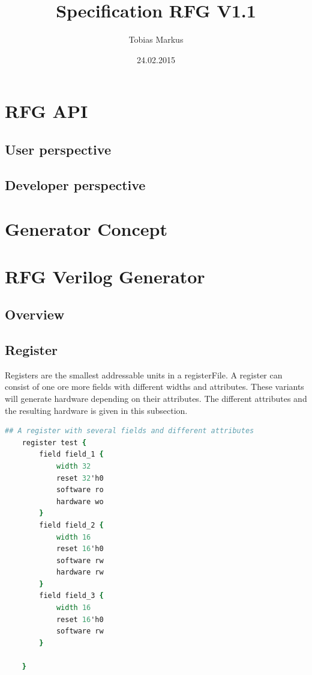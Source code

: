 \documentclass[12pt,a4paper]{article}
\begin{document}
\title{Specification RFG V1.1}
\author{Tobias Markus}
\date{24.02.2015}

\maketitle

\tableofcontents
\newpage
\section{RFG API}
\subsection{User perspective}
\subsection{Developer perspective}
\section{Generator Concept}
\section{RFG Verilog Generator}

\subsection{Overview}
\newpage
\subsection{Register}
Registers are the smallest addressable units in a registerFile. A register can consist of one ore more fields with different widths and attributes. These variants will generate hardware depending on their attributes. The different attributes and the resulting hardware is given in this subsection. 

\begin{lstlisting}[linewidth=\textwidth,language=tcl,basicstyle=\small,tabsize=4]
    ## A register with several fields and different attributes
    register test {
        field field_1 {
            width 32
            reset 32'h0
            software ro
            hardware wo
        }
        field field_2 {
            width 16
            reset 16'h0
            software rw
            hardware rw
        }
        field field_3 {
            width 16
            reset 16'h0
            software rw
        }

    }
\end{lstlisting}
\end{document}
